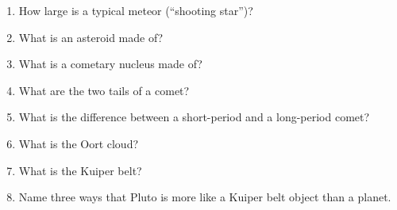 
\begin{enumerate}
\item How large is a typical meteor (``shooting star'')?
\vspace{80pt}
\item What is an asteroid made of?
\vspace{80pt}
\item What is a cometary nucleus made of?
\vspace{80pt}
\item What are the two tails of a comet?
\vspace{80pt}
\item What is the difference between a short-period and a long-period
  comet?
\vspace{80pt}
\item What is the Oort cloud?
\vspace{80pt}
\item What is the Kuiper belt?
\vspace{80pt}
\item Name three ways that Pluto is more like a Kuiper belt object
  than a planet.
\vspace{80pt}
\end{enumerate}
